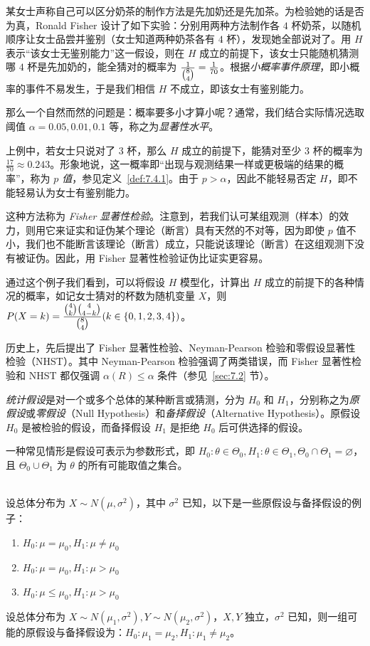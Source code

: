 \documentclass[../main.tex]{subfiles}
\begin{document}
\begin{example}
    某女士声称自己可以区分奶茶的制作方法是先加奶还是先加茶。为检验她的话是否为真，Ronald Fisher 设计了如下实验：分别用两种方法制作各 $4$ 杯奶茶，以随机顺序让女士品尝并鉴别（女士知道两种奶茶各有 $4$ 杯），发现她全部说对了。用 $H$ 表示“该女士无鉴别能力”这一假设，则在 $H$ 成立的前提下，该女士只能随机猜测哪 $4$ 杯是先加奶的，能全猜对的概率为 $\frac1{\tbinom 84}=\frac 1{70}$。根据\emph{小概率事件原理}，即小概率的事件不易发生，于是我们相信 $H$ 不成立，即该女士有鉴别能力。
\end{example}

那么一个自然而然的问题是：概率要多小才算小呢？通常，我们结合实际情况选取阈值 $\alpha=0.05,0.01,0.1$ 等，称之为\emph{显著性水平}。

上例中，若女士只说对了 $3$ 杯，那么 $H$ 成立的前提下，能猜对至少 $3$ 杯的概率为 $\frac{17}{70}\approx0.243$。形象地说，这一概率即“出现与观测结果一样或更极端的结果的概率”，称为 \emph{$p$ 值}，参见定义~\ref{def:7.4.1}。由于 $p>\alpha$，因此不能轻易否定 $H$，即不能轻易认为女士有鉴别能力。

这种方法称为 \emph{Fisher 显著性检验}。注意到，若我们认可某组观测（样本）的效力，则用它来证实和证伪某个理论（断言）具有天然的不对等，因为即使 $p$ 值不小，我们也不能断言该理论（断言）成立，只能说该理论（断言）在这组观测下没有被证伪。因此，用 Fisher 显著性检验证伪比证实更容易。

通过这个例子我们看到，可以将假设 $H$ 模型化，计算出 $H$ 成立的前提下的各种情况的概率，如记女士猜对的杯数为随机变量 $X$，则 $P(X=k)=\frac{\tbinom 4k\tbinom 4{4-k}}{\tbinom 84}(k\in\{0,1,2,3,4\})$。

历史上，先后提出了 Fisher 显著性检验、Neyman-Pearson 检验和零假设显著性检验（NHST）。其中 Neyman-Pearson 检验强调了两类错误，而 Fisher 显著性检验和 NHST 都仅强调 $\alpha(R)\leq\alpha$ 条件（参见~\ref{sec:7.2} 节）。

\emph{统计假设}是对一个或多个总体的某种断言或猜测，分为 $H_0$ 和 $H_1$，分别称之为\emph{原假设}或\emph{零假设}（Null Hypothesis）和\emph{备择假设}（Alternative Hypothesis）。原假设 $H_0$ 是被检验的假设，而备择假设 $H_1$ 是拒绝 $H_0$ 后可供选择的假设。

一种常见情形是假设可表示为参数形式，即 $H_0:\theta\in\Theta_0,H_1:\theta\in\Theta_1,\Theta_0\cap\Theta_1=\varnothing$，且 $\Theta_0\cup\Theta_1$ 为 $\theta$ 的所有可能取值之集合。

\begin{example}
    \mbox{}\\
    设总体分布为 $X\sim N(\mu,\sigma^2)$，其中 $\sigma^2$ 已知，以下是一些原假设与备择假设的例子：
    \begin{enumerate}
        \item $H_0:\mu=\mu_0,H_1:\mu\neq\mu_0$
        \item $H_0:\mu=\mu_0,H_1:\mu>\mu_0$
        \item $H_0:\mu\leq\mu_0,H_1:\mu>\mu_0$
    \end{enumerate}
    设总体分布为 $X\sim N(\mu_1,\sigma^2),Y\sim N(\mu_2,\sigma^2)$，$X,Y$ 独立，$\sigma^2$ 已知，则一组可能的原假设与备择假设为：$H_0:\mu_1=\mu_2,H_1:\mu_1\neq\mu_2$。
\end{example}
\end{document}

